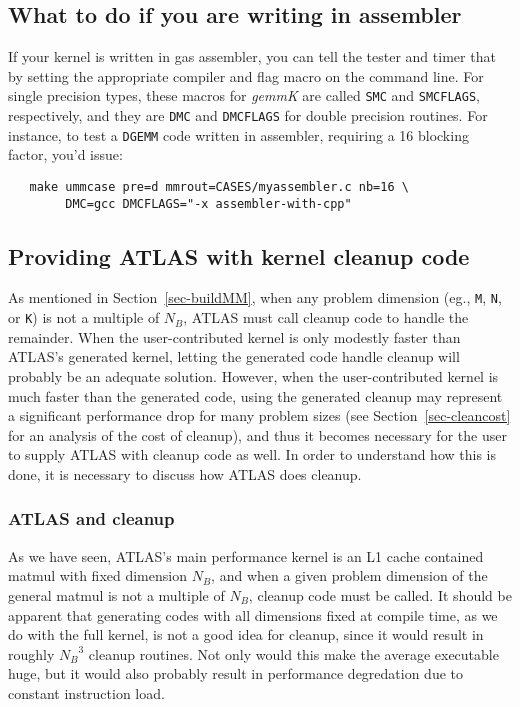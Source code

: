 \documentclass[11pt]{article}
\begin{document}
\subsection{What to do if you are writing in assembler}
If your kernel is written in gas assembler, you can tell the tester
and timer that by setting the appropriate compiler and flag macro on
the command line.  For single precision types, these macros for {\it gemmK}
are called {\tt SMC} and {\tt SMCFLAGS}, respectively, and they are
{\tt DMC} and {\tt DMCFLAGS} for double precision routines.
For instance, to test a {\tt DGEMM} code written in assembler, requiring
a 16 blocking factor, you'd issue:
\begin{verbatim}
   make ummcase pre=d mmrout=CASES/myassembler.c nb=16 \
        DMC=gcc DMCFLAGS="-x assembler-with-cpp"
\end{verbatim}

\subsection{Providing ATLAS with kernel cleanup code}
As mentioned in Section~\ref{sec-buildMM}, when any problem dimension
(eg., {\tt M}, {\tt N}, or {\tt K}) is not a multiple of $N_B$, ATLAS
must call cleanup code to handle the remainder.  When the user-contributed
kernel is only modestly faster than ATLAS's generated kernel, letting
the generated code handle cleanup will probably be an adequate solution.
However, when the user-contributed kernel is much faster than the generated
code, using the generated cleanup may represent a significant performance
drop for many problem sizes (see Section~\ref{sec-cleancost} for an
analysis of the cost of cleanup), and thus it becomes necessary for the user
to supply ATLAS with cleanup code as well.  In order to understand how
this is done, it is necessary to discuss how ATLAS does cleanup.

\subsubsection{ATLAS and cleanup}
As we have seen, ATLAS's main performance kernel is an L1 cache contained
matmul with fixed dimension $N_B$, and when a given problem dimension of
the general matmul is not a multiple of $N_B$, cleanup code must be
called.  It should be apparent that generating codes with all dimensions
fixed at compile time, as we do with the full kernel, is not a good idea
for cleanup, since it would result in roughly ${N_B}^3$ cleanup routines.
Not only would this make the average executable huge, but it would also
probably result in performance degredation due to constant instruction load.
\end{document}

